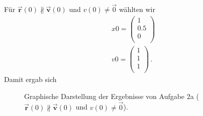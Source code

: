 Für $\vec{\textbf{r}}(0) \nparallel \vec{\textbf{v}}(0)$ und $v(0) \neq \vec{0}$ wählten wir
\begin{equation*}
	\begin{split}
		&x0 =
		 \begin{pmatrix}
			1\\
			0.5\\
			0 \\
		\end{pmatrix} \\
		& v0 = 
		\begin{pmatrix}
		1 \\
		1 \\
		1 \\
		\end{pmatrix} \, .
	\end{split}
\end{equation*}
Damit ergab sich
\begin{landscape}
	\begin{figure}
		\caption{Graphische Darstellung der Ergebnisse von Aufgabe 2a ( $\vec{\textbf{r}}(0) \nparallel \vec{\textbf{v}}(0)$ und $v(0) \neq \vec{0}$).}
		\label{fig:a22}
	\end{figure}
\end{landscape}





